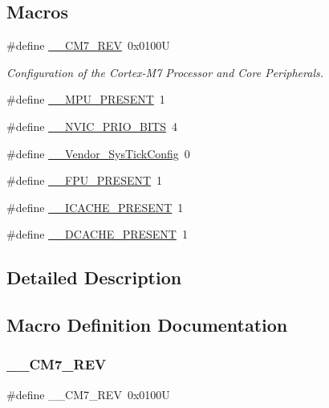 \subsection*{Macros}
\begin{DoxyCompactItemize}
\item 
\#define \mbox{\hyperlink{group__stm32f722xx_ga8eb40c0d30a09a0ae388e56b21d8f22c}{\+\_\+\+\_\+\+C\+M7\+\_\+\+R\+EV}}~0x0100U
\begin{DoxyCompactList}\small\item\em Configuration of the Cortex-\/\+M7 Processor and Core Peripherals. \end{DoxyCompactList}\item 
\#define \mbox{\hyperlink{group__stm32f722xx_ga4127d1b31aaf336fab3d7329d117f448}{\+\_\+\+\_\+\+M\+P\+U\+\_\+\+P\+R\+E\+S\+E\+NT}}~1
\item 
\#define \mbox{\hyperlink{group__stm32f722xx_gae3fe3587d5100c787e02102ce3944460}{\+\_\+\+\_\+\+N\+V\+I\+C\+\_\+\+P\+R\+I\+O\+\_\+\+B\+I\+TS}}~4
\item 
\#define \mbox{\hyperlink{group__stm32f722xx_gab58771b4ec03f9bdddc84770f7c95c68}{\+\_\+\+\_\+\+Vendor\+\_\+\+Sys\+Tick\+Config}}~0
\item 
\#define \mbox{\hyperlink{group__stm32f722xx_gac1ba8a48ca926bddc88be9bfd7d42641}{\+\_\+\+\_\+\+F\+P\+U\+\_\+\+P\+R\+E\+S\+E\+NT}}~1
\item 
\#define \mbox{\hyperlink{group__stm32f722xx_ga3580fa1aeb7c2ed580904f8f70f8a919}{\+\_\+\+\_\+\+I\+C\+A\+C\+H\+E\+\_\+\+P\+R\+E\+S\+E\+NT}}~1
\item 
\#define \mbox{\hyperlink{group__stm32f722xx_ga11d3ac679daeb58d0cec0a4e6ca59010}{\+\_\+\+\_\+\+D\+C\+A\+C\+H\+E\+\_\+\+P\+R\+E\+S\+E\+NT}}~1
\end{DoxyCompactItemize}


\subsection{Detailed Description}


\subsection{Macro Definition Documentation}
\mbox{\label{group__stm32f722xx_ga8eb40c0d30a09a0ae388e56b21d8f22c}} 
\subsubsection{\texorpdfstring{\_\_CM7\_REV}{\_\_CM7\_REV}}
{\footnotesize\ttfamily \#define \+\_\+\+\_\+\+C\+M7\+\_\+\+R\+EV~0x0100U}



